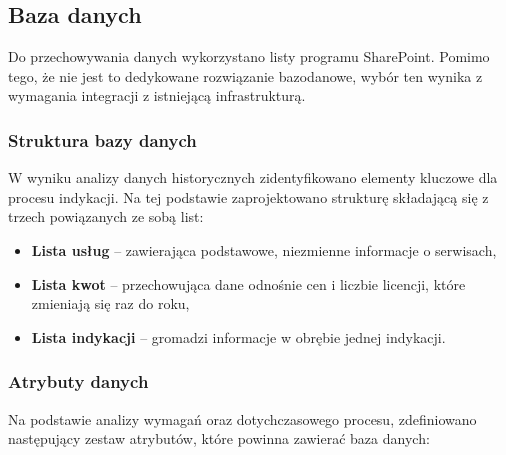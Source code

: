 \subsection{Baza danych}

Do przechowywania danych wykorzystano listy programu SharePoint. Pomimo tego, że nie jest to dedykowane rozwiązanie bazodanowe, wybór ten wynika z wymagania integracji z istniejącą infrastrukturą.

\subsubsection{Struktura bazy danych}
\label{Subsec: StrukturaBazyDanych}
W wyniku analizy danych historycznych zidentyfikowano elementy kluczowe dla procesu indykacji. Na tej podstawie zaprojektowano strukturę składającą się z trzech powiązanych ze sobą list:

\begin{itemize}
  \item \textbf{Lista usług} -- zawierająca podstawowe, niezmienne informacje o serwisach,
  \item \textbf{Lista kwot} -- przechowująca dane odnośnie cen i liczbie licencji, które zmieniają się raz do roku,
  \item \textbf{Lista indykacji} -- gromadzi informacje w obrębie jednej indykacji.
\end{itemize}
\subsubsection{Atrybuty danych}
Na podstawie analizy wymagań oraz dotychczasowego procesu, zdefiniowano następujący zestaw atrybutów, które powinna zawierać baza danych:


